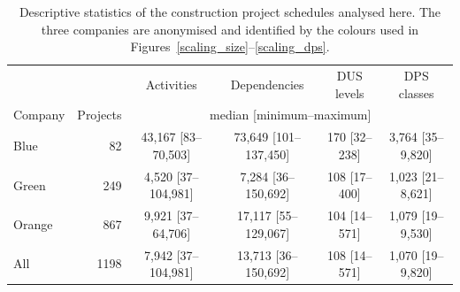 \begin{table}[t]
\centering
\small
\begin{tabular}{lrcccc}
\hline
 & & Activities & Dependencies & DUS levels & DPS classes \\
Company & Projects & \multicolumn{4}{c}{median [minimum--maximum]} \\
\hline
Blue & 82 & 43{,}167 [83--70{,}503] & 73{,}649 [101--137{,}450] & 170 [32--238] & 3{,}764 [35--9{,}820] \\
Green & 249 & 4{,}520 [37--104{,}981] & 7{,}284 [36--150{,}692] & 108 [17--400] & 1{,}023 [21--8{,}621] \\
Orange & 867 & 9{,}921 [37--64{,}706] & 17{,}117 [55--129{,}067] & 104 [14--571] & 1{,}079 [19--9{,}530] \\
\hline
All & 1198 & 7{,}942 [37--104{,}981] & 13{,}713 [36--150{,}692] & 108 [14--571] & 1{,}070 [19--9{,}820] \\
\hline
\end{tabular}
\caption{Descriptive statistics of the construction project schedules analysed here. The three companies are anonymised and identified by the colours used in Figures~\ref{scaling_size}--\ref{scaling_dps}.}
\label{descriptive}
\end{table}